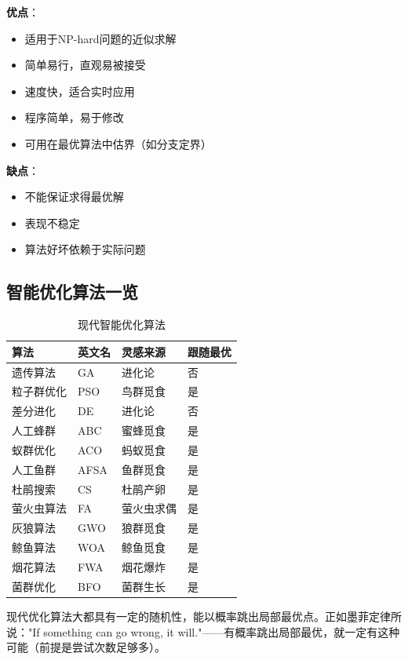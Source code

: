 \textbf{优点}：
\begin{itemize}[itemsep=0.2em]
    \item 适用于NP-hard问题的近似求解
    \item 简单易行，直观易被接受
    \item 速度快，适合实时应用
    \item 程序简单，易于修改
    \item 可用在最优算法中估界（如分支定界）
\end{itemize}

\textbf{缺点}：
\begin{itemize}[itemsep=0.2em]
    \item 不能保证求得最优解
    \item 表现不稳定
    \item 算法好坏依赖于实际问题
\end{itemize}

\subsection{智能优化算法一览}

\begin{table}[htbp]
\centering
\caption{现代智能优化算法}
\begin{tabular}{@{}llll@{}}
\toprule
\textbf{算法} & \textbf{英文名} & \textbf{灵感来源} & \textbf{跟随最优} \\
\midrule
遗传算法 & GA & 进化论 & 否 \\
粒子群优化 & PSO & 鸟群觅食 & 是 \\
差分进化 & DE & 进化论 & 否 \\
人工蜂群 & ABC & 蜜蜂觅食 & 是 \\
蚁群优化 & ACO & 蚂蚁觅食 & 是 \\
人工鱼群 & AFSA & 鱼群觅食 & 是 \\
杜鹃搜索 & CS & 杜鹃产卵 & 是 \\
萤火虫算法 & FA & 萤火虫求偶 & 是 \\
灰狼算法 & GWO & 狼群觅食 & 是 \\
鲸鱼算法 & WOA & 鲸鱼觅食 & 是 \\
烟花算法 & FWA & 烟花爆炸 & 是 \\
菌群优化 & BFO & 菌群生长 & 是 \\
\bottomrule
\end{tabular}
\end{table}

\begin{notebox}[概率算法与墨菲定律]
现代优化算法大都具有一定的随机性，能以概率跳出局部最优点。正如墨菲定律所说："If something can go wrong, it will."——有概率跳出局部最优，就一定有这种可能（前提是尝试次数足够多）。
\end{notebox}

